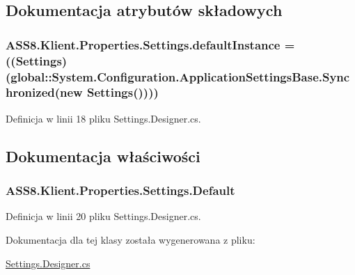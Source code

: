 \subsection{Dokumentacja atrybutów składowych}
\hypertarget{a00027_b331e0a3aa3a08061108355a2fab8905}{
\subsubsection[{defaultInstance}]{ {\bf ASS8.Klient.Properties.Settings.defaultInstance} = (({\bf Settings})(global::System.Configuration.ApplicationSettingsBase.Synchronized(new {\bf Settings}())))}}
\label{d0/d33/a00027_b331e0a3aa3a08061108355a2fab8905}




Definicja w linii 18 pliku Settings.Designer.cs.

\subsection{Dokumentacja właściwości}
\hypertarget{a00027_3b1e7a8cb7c1642c0b661d0a42f5b023}{
\subsubsection[{Default}]{ ASS8.Klient.Properties.Settings.Default}}
\label{d0/d33/a00027_3b1e7a8cb7c1642c0b661d0a42f5b023}




Definicja w linii 20 pliku Settings.Designer.cs.

Dokumentacja dla tej klasy została wygenerowana z pliku:\begin{CompactItemize}
\item 
\hyperlink{a00052}{Settings.Designer.cs}\end{CompactItemize}
